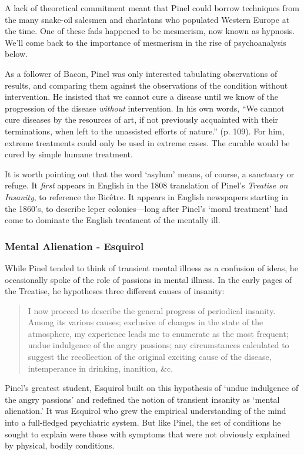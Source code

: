 \begin{refsection}
A lack of theoretical commitment meant that Pinel could borrow techniques from the many snake-oil salesmen and charlatans who populated Western Europe at the time. One of these fads happened to be mesmerism, now known as hypnosis. We’ll come back to the importance of mesmerism in the rise of psychoanalysis below.

As a follower of Bacon, Pinel was only interested tabulating observations of results, and comparing them against the observations of the condition without intervention. He insisted that we cannot cure a disease until we know of the progression of the disease \emph{without} intervention. In his own words, “We cannot cure diseases by the resources of art, if not previously acquainted with their terminations, when left to the unassisted efforts of nature.” (p. 109). For him, extreme treatments could only be used in extreme cases. The curable would be cured by simple humane treatment.

It is worth pointing out that the word `asylum' means, of course, a sanctuary or refuge. It \emph{first} appears in English in the 1808 translation of Pinel's \emph{Treatise on Insanity}, to reference the Bicêtre. It appears in English newspapers starting in the 1860's, to describe leper colonies---long after Pinel's `moral treatment' had come to dominate the English treatment of the mentally ill.

\subsubsection{Mental Alienation - Esquirol}
\label{mentalalienation-esquirol}

While Pinel tended to think of transient mental illness as a confusion of ideas, he occasionally spoke of the role of passions in mental illness. In the early pages of the Treatise, he hypotheses three different causes of insanity:

\begin{quote}

I now proceed to describe the general progress of periodical insanity. Among its various causes; exclusive of changes in the state of the atmosphere, my experience leads me to enumerate as the most frequent; undue indulgence of the angry passions; any circumstances calculated to suggest the recollection of the original exciting cause of the disease, intemperance in drinking, inanition, \&c. ~\citep[p. 12]{Pinel:1806ws}
\end{quote}

Pinel's greatest student, Esquirol built on this hypothesis of `undue indulgence of the angry passions' and redefined the notion of transient insanity as `mental alienation.' It was Esquirol who grew the empirical understanding of the mind into a full-fledged psychiatric system. But like Pinel, the set of conditions he sought to explain were those with symptoms that were not obviously explained by physical, bodily conditions.


\end{refsection}
